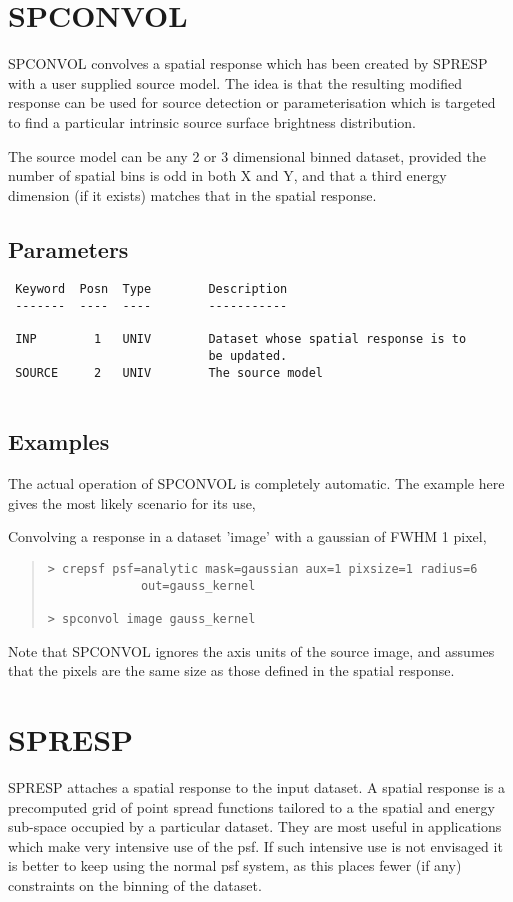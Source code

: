 \documentclass{book}
\renewcommand{\_}{{\tt\char'137}}     %
\begin{document}
\section{SPCONVOL}
SPCONVOL convolves a spatial response which has been created by
SPRESP with a user supplied source model. The idea is that
the resulting modified response can be used for source detection
or parameterisation which is targeted to find a particular
intrinsic source surface brightness distribution.
 
The source model can be any 2 or 3 dimensional binned dataset,
provided the number of spatial bins is odd in both X and Y,
and that a third energy dimension (if it exists) matches that
in the spatial response.
 
\subsection{Parameters}
\begin{verbatim}
 Keyword  Posn  Type        Description
 -------  ----  ----        -----------
 
 INP        1   UNIV        Dataset whose spatial response is to
                            be updated.
 SOURCE     2   UNIV        The source model
 
\end{verbatim}\subsection{Examples}
The actual operation of SPCONVOL is completely automatic. The
example here gives the most likely scenario for its use,
 
Convolving a response in a dataset 'image' with a gaussian of
FWHM 1 pixel,
\begin{quote}\begin{verbatim}
> crepsf psf=analytic mask=gaussian aux=1 pixsize=1 radius=6
             out=gauss_kernel
 
> spconvol image gauss_kernel
\end{verbatim}\end{quote}
Note that SPCONVOL ignores the axis units of the source image,
and assumes that the pixels are the same size as those defined
in the spatial response.
 
\section{SPRESP}
SPRESP attaches a spatial response to the input dataset. A spatial
response is a precomputed grid of point spread functions tailored
to a the spatial and energy sub-space occupied by a particular
dataset. They are most useful in applications which make very
intensive use of the psf. If such intensive use is not envisaged it
is better to keep using the normal psf system, as this places fewer
(if any) constraints on the binning of the dataset.
 
\end{document}
